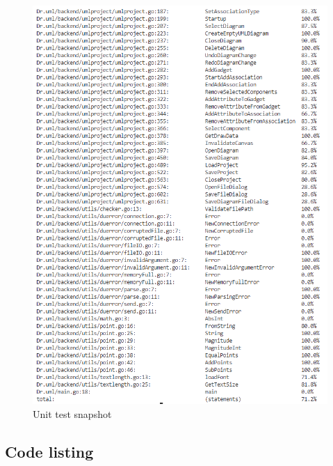 \documentclass[12pt]{article}
\begin{document}
    \begin{figure}[H]
        \begin{center}
            \includegraphics[width=0.95\linewidth]
            {assets/hw7/cover4.png}
            \caption{Unit test snapshot}
        \end{center}
    \end{figure}

    \subsection{Code listing}
\end{document}
